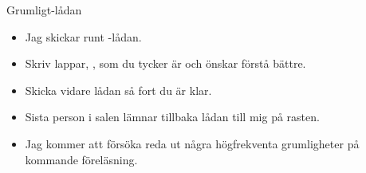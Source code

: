 






\begin{Slide}{Grumligt-lådan}
\begin{itemize}
\item Jag skickar runt -lådan.
\item Skriv lappar, , som du tycker är  och  önskar förstå bättre.
\item Skicka vidare lådan så fort du är klar.
\item Sista person i salen lämnar tillbaka lådan till mig på rasten.
\item Jag kommer att försöka reda ut några högfrekventa grumligheter på kommande föreläsning.
\end{itemize}
\end{Slide}
